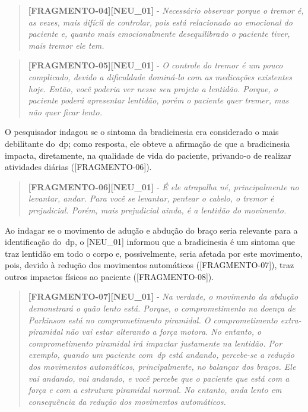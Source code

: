 \begin{quote}
\textbf{[FRAGMENTO-04][NEU\_01]} - 
\emph{
Necessário observar porque o tremor é, as vezes, mais difícil de controlar, pois está relacionado ao emocional do paciente e, quanto mais emocionalmente desequilibrado o paciente tiver, mais tremor ele tem.
}
\end{quote}

\begin{quote}
\textbf{[FRAGMENTO-05][NEU\_01]} - 
\emph{
O controle do tremor é um pouco complicado, devido a dificuldade dominá-lo com as medicações existentes hoje. Então, você poderia ver nesse seu projeto a lentidão. Porque, o paciente poderá apresentar lentidão, porém o paciente quer tremer, mas não quer ficar lento.
}
\end{quote}


O pesquisador indagou se o sintoma da bradicinesia era considerado o mais debilitante do~\ac{dp}; como resposta, ele obteve a afirmação de que a bradicinesia impacta, diretamente, na qualidade de vida do paciente, privando-o de realizar atividades diárias ([FRAGMENTO-06]).

\begin{quote}
\textbf{[FRAGMENTO-06][NEU\_01]} - 
\emph{
É ele atrapalha né, principalmente no levantar, andar. Para você se levantar, pentear o cabelo, o tremor é prejudicial. Porém, mais prejudicial ainda, é a lentidão do movimento.
}
\end{quote}

Ao indagar se o movimento de adução e abdução do braço seria relevante para a identificação do~\ac{dp}, o [NEU\_01] informou que a bradicinesia é um sintoma que traz lentidão em todo o corpo e, possivelmente, seria afetada por este movimento, pois, devido à redução dos movimentos automáticos ([FRAGMENTO-07]), traz outros impactos físicos ao paciente ([FRAGMENTO-08]).

\begin{quote}
\textbf{[FRAGMENTO-07][NEU\_01]} - 
\emph{
Na verdade, o movimento da abdução demonstrará o quão lento está. Porque, o comprometimento na doença de Parkinson está no comprometimento piramidal. O comprometimento extra-piramidal não vai estar alterando a força motora. No entanto, o comprometimento piramidal irá impactar justamente na lentidão. Por exemplo, quando um paciente com~\ac{dp} está andando, percebe-se a redução dos movimentos automáticos, principalmente, no balançar dos braços. Ele vai andando, vai andando, e você percebe que o paciente que está com a força e com a estrutura piramidal normal. No entanto, anda lento em consequência da redução dos movimentos automáticos.
}
\end{quote}


